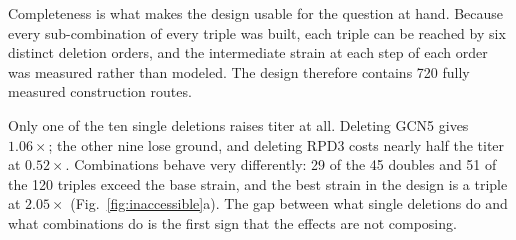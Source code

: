 Completeness is what makes the design usable for the question at hand. Because every
sub-combination of every triple was built, each triple can be reached by six distinct
deletion orders, and the intermediate strain at each step of each order was measured rather
than modeled. The design therefore contains 720 fully measured construction routes.

Only one of the ten single deletions raises titer at all. Deleting GCN5 gives
$1.06\times$; the other nine lose ground, and deleting RPD3 costs nearly half the titer at
$0.52\times$. Combinations behave very differently: 29 of the 45 doubles and 51 of the 120
triples exceed the base strain, and the best strain in the design is a triple at
$2.05\times$ (Fig.~\ref{fig:inaccessible}a). The gap between what single deletions do and what
combinations do is the first sign that the effects are not composing.

